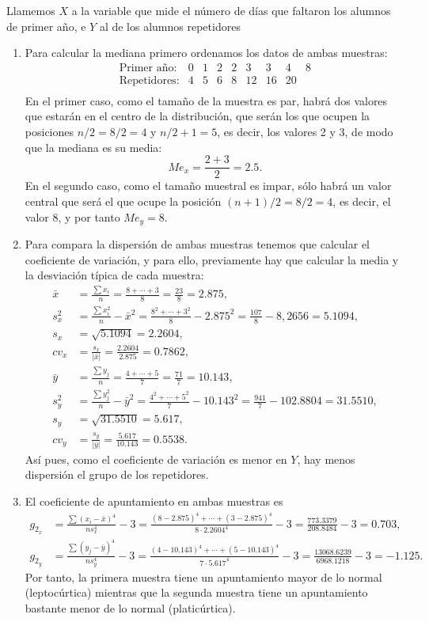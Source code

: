{Llamemos $X$ a la variable que mide el número de días que faltaron los alumnos de primer año, e $Y$ al de los alumnos repetidores
\begin{enumerate}
\item Para calcular la mediana primero ordenamos los datos de ambas muestras:
\[
\begin{array}{lcccccccc}
\mbox{Primer año:}  & 0 & 1 & 2  & 2  & 3  & 3 & 4 & 8 \\
\mbox{Repetidores:} & 4 & 5 & 6 & 8 & 12 & 16 & 20 &   \\
\end{array}
\]
En el primer caso, como el tamaño de la muestra es par, habrá dos valores que estarán en el centro de la distribución, que serán los que ocupen la posiciones $n/2=8/2=4$ y $n/2+1=5$, es decir, los valores 2 y 3, de modo que la mediana es su media:
\[
Me_{x}=\frac{2+3}{2}=2.5.
\]
En el segundo caso, como el tamaño muestral es impar, sólo habrá un valor central que será el que ocupe la posición $(n+1)/2=8/2=4$, es decir, el valor 8, y por tanto $Me_{y}=8$.

\item Para compara la dispersión de ambas muestras tenemos que calcular el coeficiente de variación, y para ello, previamente hay que calcular la media y la desviación típica de cada muestra:
\begin{align*}
\bar{x} & = \frac{\sum x_{i}}{n}=\frac{8+\cdots+3}{8}=\frac{23}{8}=2.875,  \\
s_{x}^2 & = \frac{\sum x_{i}^2}{n}-\bar{x}^2 =
\frac{8^2+\cdots+3^2}{8}-2.875^2=\frac{107}{8}-8,2656=5.1094,  \\
s_{x} & = \sqrt{5.1094}=2.2604,  \\
cv_x &=\frac{s_x}{|\bar{x}|}=\frac{2.2604}{2.875}=0.7862,\\
\bar{y} & = \frac{\sum y_{j}}{n}=\frac{4+\cdots+5}{7}=
\frac{71}{7}=10.143,  \\
s_{y}^2 & = \frac{\sum y_{j}^2}{n}-\bar{y}^2 =
\frac{4^2+\cdots+5^2}{7}-10.143^2=\frac{941}{7}-102.8804=31.5510,  \\
s_{y} & = \sqrt{31.5510}=5.617,  \\
cv_y &=\frac{s_y}{|\bar{y}|}=\frac{5.617}{10.143}=0.5538.
\end{align*}
Así pues, como el coeficiente de variación es menor en $Y$, hay menos dispersión el grupo de los repetidores.

\item El coeficiente de apuntamiento en ambas muestras es
\begin{align*}
g_{2_x} &=\frac{\sum (x_i-\bar{x})^4}{ns_x^4}-3= \frac{(8-2.875)^4+\cdots + (3-2.875)^4}{8\cdot 2.2604^4}-3=\frac{773.3379}{208.8484}-3=0.703,\\
g_{2_y} &=\frac{\sum (y_j-\bar{y})^4}{ns_y^4}-3= \frac{(4-10.143)^4+\cdots + (5-10.143)^4}{7\cdot 5.617^4}-3=\frac{13068.6239}{6968.1218}-3=-1.125.
\end{align*}
Por tanto, la primera muestra tiene un apuntamiento mayor de lo normal (leptocúrtica) mientras que la segunda muestra tiene un apuntamiento bastante menor de lo normal (platicúrtica). 
\end{enumerate}
}


